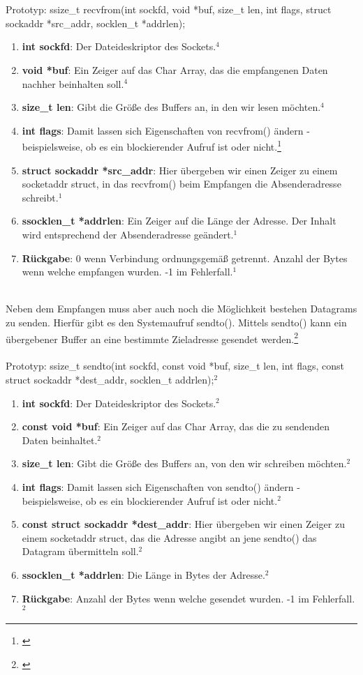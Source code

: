 \\\\
Prototyp: ssize\_t recvfrom(int sockfd, void *buf, size\_t len, int flags, struct sockaddr *src\_addr, socklen\_t *addrlen);
\begin{enumerate}
    \item \textbf{int sockfd}: Der Dateideskriptor des Sockets.$^{4}$
    \item \textbf{void *buf}: Ein Zeiger auf das Char Array, das die empfangenen Daten nachher beinhalten soll.$^{4}$
    \item \textbf{size\_t len}: Gibt die Größe des Buffers an, in den wir lesen möchten.$^{4}$
    \\
    \item \textbf{int flags}: Damit lassen sich Eigenschaften von recvfrom() ändern - beispielsweise, ob es ein blockierender Aufruf ist oder nicht.\footnote[1]{\cite[Vgl.][]{SRV17}}
    \item \textbf{struct sockaddr *src\_addr}: Hier übergeben wir einen Zeiger zu einem socketaddr struct, in das recvfrom() beim Empfangen die Absenderadresse schreibt.$^{1}$
    \item \textbf{ssocklen\_t *addrlen}: Ein Zeiger auf die Länge der Adresse. Der Inhalt wird entsprechend der Absenderadresse geändert.$^{1}$
    \item \textbf{Rückgabe}: 0 wenn Verbindung ordnungsgemäß getrennt. Anzahl der Bytes wenn welche empfangen wurden. -1 im Fehlerfall.$^{1}$
\end{enumerate} 
\ \\%
Neben dem Empfangen muss aber auch noch die Möglichkeit bestehen Datagrams zu senden. Hierfür gibt es den Systemaufruf sendto(). Mittels sendto() kann ein übergebener Buffer an eine bestimmte Zieladresse gesendet werden.\footnote[2]{\cite[Vgl.][]{SRV18}}
\\\\
Prototyp: ssize\_t sendto(int sockfd, const void *buf, size\_t len, int flags, const struct sockaddr *dest\_addr, socklen\_t addrlen);$^{2}$
\begin{enumerate}
    \item \textbf{int sockfd}: Der Dateideskriptor des Sockets.$^{2}$
    \item \textbf{const void *buf}: Ein Zeiger auf das Char Array, das die zu sendenden Daten beinhaltet.$^{2}$
    \item \textbf{size\_t len}: Gibt die Größe des Buffers an, von den wir schreiben möchten.$^{2}$
    \item \textbf{int flags}: Damit lassen sich Eigenschaften von sendto() ändern - beispielsweise, ob es ein blockierender Aufruf ist oder nicht.$^{2}$
    \item \textbf{const struct sockaddr *dest\_addr}: Hier übergeben wir einen Zeiger zu einem socketaddr struct, das die Adresse angibt an jene sendto() das Datagram übermitteln soll.$^{2}$
    \item \textbf{ssocklen\_t *addrlen}: Die Länge in Bytes der Adresse.$^{2}$
    \item \textbf{Rückgabe}: Anzahl der Bytes wenn welche gesendet wurden. -1 im Fehlerfall.$^{2}$
\end{enumerate} 
